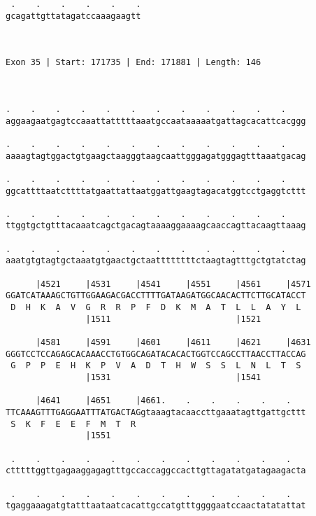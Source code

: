 \documentclass{article}
\begin{document}
\begin{Verbatim}
 .    .    .    .    .    .
gcagattgttatagatccaaagaagtt
                           
                           
 
Exon 35 | Start: 171735 | End: 171881 | Length: 146



.    .    .    .    .    .    .    .    .    .    .    .    
aggaagaatgagtccaaattatttttaaatgccaataaaaatgattagcacattcacggg
                                                            
.    .    .    .    .    .    .    .    .    .    .    .    
aaaagtagtggactgtgaagctaagggtaagcaattgggagatgggagtttaaatgacag
                                                            
.    .    .    .    .    .    .    .    .    .    .    .    
ggcattttaatcttttatgaattattaatggattgaagtagacatggtcctgaggtcttt
                                                            
.    .    .    .    .    .    .    .    .    .    .    .    
ttggtgctgtttacaaatcagctgacagtaaaaggaaaagcaaccagttacaagttaaag
                                                            
.    .    .    .    .    .    .    .    .    .    .    .    
aaatgtgtagtgctaaatgtgaactgctaattttttttctaagtagtttgctgtatctag
                                                            
      |4521     |4531     |4541     |4551     |4561     |4571
GGATCATAAAGCTGTTGGAAGACGACCTTTTGATAAGATGGCAACACTTCTTGCATACCT
 D  H  K  A  V  G  R  R  P  F  D  K  M  A  T  L  L  A  Y  L 
                |1511                         |1521         
  
      |4581     |4591     |4601     |4611     |4621     |4631
GGGTCCTCCAGAGCACAAACCTGTGGCAGATACACACTGGTCCAGCCTTAACCTTACCAG
 G  P  P  E  H  K  P  V  A  D  T  H  W  S  S  L  N  L  T  S 
                |1531                         |1541         
  
      |4641     |4651     |4661.    .    .    .    .    .   
TTCAAAGTTTGAGGAATTTATGACTAGgtaaagtacaaccttgaaatagttgattgcttt
 S  K  F  E  E  F  M  T  R                                  
                |1551                                       
  
 .    .    .    .    .    .    .    .    .    .    .    .   
ctttttggttgagaaggagagtttgccaccaggccacttgttagatatgatagaagacta
                                                            
 .    .    .    .    .    .    .    .    .    .    .    .   
tgaggaaagatgtatttaataatcacattgccatgtttggggaatccaactatatattat
                                                            

\end{Verbatim}
\end{document}
